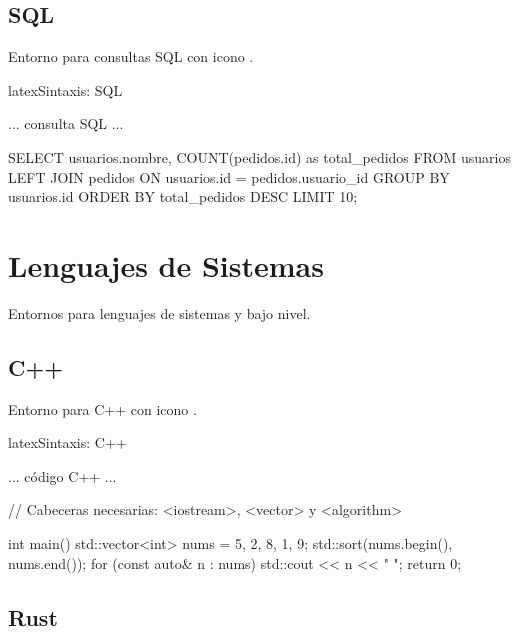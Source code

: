 \subsection{SQL}

Entorno para consultas SQL con icono .

\begin{codigosimple}{latex}{Sintaxis: SQL}
\begin{sqlcode}
  ... consulta SQL ...
\end{sqlcode}
\end{codigosimple}

\begin{sqlcode}
SELECT
    usuarios.nombre,
    COUNT(pedidos.id) as total_pedidos
FROM usuarios
LEFT JOIN pedidos ON usuarios.id = pedidos.usuario_id
GROUP BY usuarios.id
ORDER BY total_pedidos DESC
LIMIT 10;
\end{sqlcode}

\section{Lenguajes de Sistemas}
\label{sec:sistemas}

Entornos para lenguajes de sistemas y bajo nivel.

\subsection{C++}

Entorno para C++ con icono .

\begin{codigosimple}{latex}{Sintaxis: C++}
\begin{cppcode}
  ... código C++ ...
\end{cppcode}
\end{codigosimple}

\begin{cppcode}
// Cabeceras necesarias: <iostream>, <vector> y <algorithm>

int main() {
    std::vector<int> nums = {5, 2, 8, 1, 9};
    std::sort(nums.begin(), nums.end());
    for (const auto& n : nums) {
        std::cout << n << " ";
    }
    return 0;
}
\end{cppcode}

\subsection{Rust}

